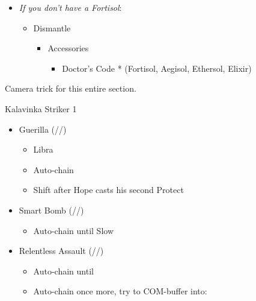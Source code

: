 \begin{paracol}{2}
\begin{upgrade}
\begin{itemize}
\begin{itemize}
\begin{itemize}
				            \end{itemize}
			      \end{itemize}
			\item \textit{If you don't have a Fortisol}:
			      \begin{itemize}
				      \item Dismantle
				            \begin{itemize}
					            \item Accessories
					                  \begin{flushleft}
						                  \begin{itemize}
							                  \item Doctor's Code * (Fortisol, Aegisol, Ethersol, Elixir)
						                  \end{itemize}
					                  \end{flushleft}
				            \end{itemize}
			      \end{itemize}
		\end{itemize}
	\end{upgrade}
	\switchcolumn
	Camera trick for this entire section.
	\switchcolumn*
	\renewcommand{\first}{[1] Guerilla (\rav/\syn/\sab)}
	\renewcommand{\second}{[2] Smart Bomb (\rav/\rav/\sab)}
	\renewcommand{\third}{[3] Mystic Tower (\rav/\sen/\rav)}
	\renewcommand{\fourth}{[4] Relentless Assault (\rav/\rav/\com)}
	\renewcommand{\fifth}{[5] Aggression (\com/\rav/\com)}
	\begin{battle}{Kalavinka Striker 1}
		\begin{itemize}
			\item \first
			      \begin{itemize}
				      \item Libra
				      \item Auto-chain
				      \item Shift after Hope casts his second Protect
			      \end{itemize}
			\item \second
			      \begin{itemize}
				      \item Auto-chain until Slow
			      \end{itemize}
			\item \fourth
			      \begin{itemize}
				      \item Auto-chain until \stagger
				      \item Auto-chain once more, try to COM-buffer into:

\end{itemize}
\end{itemize}
\end{battle}
\end{paracol}
